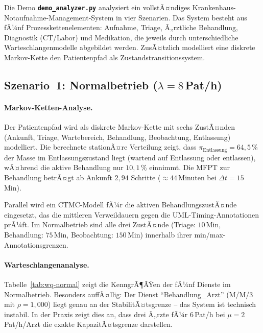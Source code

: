 ﻿\documentclass[a4paper,12pt]{report}
\theoremstyle{definition}
\begin{document}
Die Demo \texttt{\textbf{demo\_analyzer.py}} analysiert ein vollstÃ¤ndiges
Krankenhaus-Notauf\-nahme-Management-System in vier Szenarien. Das System
besteht aus fÃ¼nf Prozesskettenelementen: Aufnahme, Triage, Ã„rztliche
Behandlung, Diagnostik (CT/Labor) und Medikation, die jeweils durch
unterschiedliche Warteschlangenmodelle abgebildet werden. ZusÃ¤tzlich
modelliert eine diskrete Markov-Kette den Patientenpfad als
Zustandstransitionssystem.

\subsection{Szenario~1: Normalbetrieb ($\lambda = 8$\,Pat/h)}

\paragraph{Markov-Ketten-Analyse.}
Der Patientenpfad wird als diskrete Markov-Kette mit sechs ZustÃ¤nden
(Ankunft, Triage, Wartebereich, Behandlung, Beobachtung, Entlassung)
modelliert. Die berechnete stationÃ¤re Verteilung zeigt, dass
$\pi_\text{Entlassung} = 64{,}5\,\%$ der Masse im Entlassungszustand liegt
(wartend auf Entlassung oder entlassen), wÃ¤hrend die aktive Behandlung nur
$10{,}1\,\%$ einnimmt. Die MFPT zur Behandlung betrÃ¤gt ab Ankunft
$2{,}94$ Schritte ($\approx 44$\,Minuten bei $\Delta t = 15$\,Min).

Parallel wird ein CTMC-Modell fÃ¼r die aktiven BehandlungszustÃ¤nde
eingesetzt, das die mittleren Verweildauern gegen die UML-Timing-Annotationen
prÃ¼ft. Im Normalbetrieb sind alle drei ZustÃ¤nde (Triage: $10$\,Min,
Behandlung: $75$\,Min, Beobachtung: $150$\,Min) innerhalb ihrer
min/max-Annotationsgrenzen.

\paragraph{Warteschlangenanalyse.}
Tabelle~\ref{tab:wq-normal} zeigt die KenngrÃ¶ÃŸen der fÃ¼nf Dienste im
Normalbetrieb. Besonders auffÃ¤llig: Der Dienst ``Behandlung\_Arzt'' (M/M/3
mit $\rho = 1{,}000$) liegt genau an der StabilitÃ¤tsgrenze -- das System
ist technisch instabil. In der Praxis zeigt dies an, dass drei Ã„rzte
fÃ¼r $6$\,Pat/h bei $\mu = 2$\,Pat/h/Arzt die exakte KapazitÃ¤tsgrenze darstellen.
\end{document}
